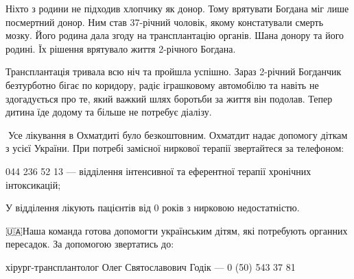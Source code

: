 Ніхто з родини не підходив хлопчику як донор. Тому врятувати Богдана міг лише
посмертний донор. Ним став 37-річний чоловік, якому констатували смерть мозку.
Його родина дала згоду на трансплантацію органів. Шана донору та його родині.
Їх рішення врятувало життя 2-річного Богдана.🙏🏻

Трансплантація тривала всю ніч та пройшла успішно. Зараз 2-річний Богданчик
безтурботно бігає по коридору, радіє іграшковому автомобілю та навіть не
здогадується про те, який важкий шлях боротьби за життя він подолав. Тепер
дитина їде додому та більше не потребує діалізу.💛

🔻Усе лікування в Охматдиті було безкоштовним. Охматдит надає допомогу діткам з
усієї України. При потребі замісної ниркової терапії звертайтеся за телефоном:

044 236 52 13 — відділення інтенсивної та еферентної терапії хронічних
інтоксикацій;

У відділення лікують пацієнтів від 0 років з нирковою недостатністю.

🇺🇦Наша команда готова допомогти українським дітям, які потребують органних
пересадок. За допомогою звертатись до:

хірург-трансплантолог Олег Святославович Годік — 0 (50) 543 37 81
